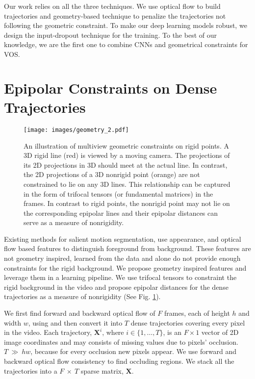 \documentclass[10pt,twocolumn,letterpaper]{article}
\begin{document}
Our work relies on all the three techniques. We use optical flow to build trajectories and geometry-based technique to penalize the trajectories not following the geometric constraint.
To make our deep learning models robust, we design the input-dropout technique for the training.
To the best of our knowledge, we are the first one to combine CNNs and geometrical constraints for VOS.  
\section{Epipolar Constraints on Dense Trajectories}
\label{epipolarDistanceSection}

\begin{figure}[t]
\centering
\texttt{[image: images/geometry\_2.pdf]}
\caption{An illustration of multiview geometric constraints on rigid points. A 3D rigid line (red) is viewed by a moving camera. The projections of its 2D projections in 3D should meet at the actual line. In contrast, the 2D projections of a 3D nonrigid point (orange) are not constrained to lie on any 3D lines. This relationship can be captured in the form of trifocal tensors (or fundamental matrices) in the frames. In contrast to rigid points, the nonrigid point may not lie on the corresponding epipolar lines and their epipolar distances can serve as a measure of nonrigidity.}
\label{fig:geometryFig}
\vspace{-0.5cm}
\end{figure}

Existing methods for salient motion segmentation, use appearance, and optical flow based features to distinguish foreground from background. These features are not geometry inspired, learned from the data and alone do not provide enough constraints for the rigid background. We propose geometry inspired features and leverage them in a learning pipeline. We use trifocal tensors to constraint the rigid background in the video and propose epipolar distances for the dense trajectories as a measure of nonrigidity (See Fig. \ref{fig:geometryFig}).

We first find forward and backward optical flow of $F$ frames, each of height $h$ and width $w$, using \cite{chen2016full} and then convert it into $T$ dense trajectories covering every pixel in the video. Each trajectory, $\mathbf{X}^i$, where $i \in \{1,\hdots,T\}$, is an $F\times1$ vector of 2D image coordinates and may consists of missing values due to pixels' occlusion. $T~\gg~hw$, because for every occlusion new pixels appear. 
We use forward and backward optical flow consistency to find occluding regions.
We stack all the trajectories into a $F~\times~T$ sparse matrix, $\mathbf{X}$. 
\end{document}
